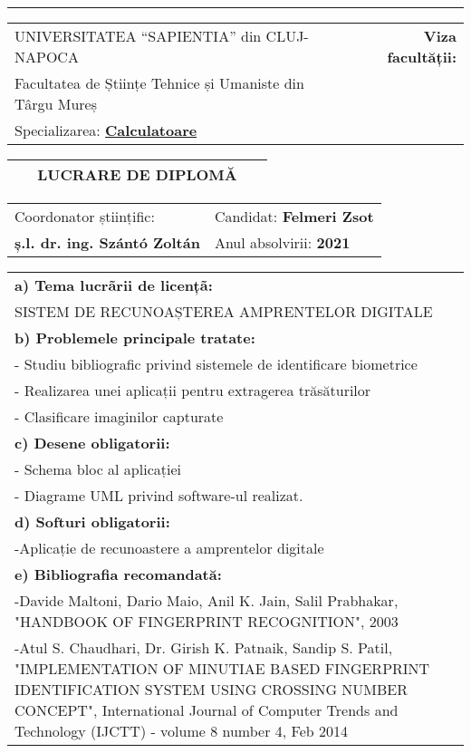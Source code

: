 \documentclass[a4paper, 11pt]{article}
\begin{document}
\begin{titlepage}
\noindent \rule{\textwidth}{1pt}
\vspace{1em}

\noindent \begin{tabular}{|l c r|}
\hline
UNIVERSITATEA “SAPIENTIA” din CLUJ-NAPOCA & & \textbf{Viza facultății:}\\
Facultatea de Științe Tehnice și Umaniste din Târgu Mureș & & \\
Specializarea: \textbf{\underline{Calculatoare}} & & \\
\hline
\end{tabular}
\begin{tabular}{|p{} c p{}|}
\ & \textbf{LUCRARE DE DIPLOMĂ} &\ \\[3pt]
\hline
\end{tabular}
\begin{tabular}{|p{} | p{}|}
Coordonator științific: & Candidat: \textbf{Felmeri Zsot}\\
\textbf{ș.l. dr. ing. Szántó Zoltán} & Anul absolvirii: \textbf{2021}\\
\hline
\end{tabular}
\begin{tabular}{|p{}|}
\textbf{a) Tema lucrãrii de licențã:}\\[3pt]
SISTEM DE RECUNOAȘTEREA AMPRENTELOR DIGITALE\\[4ex]
\textbf{b) Problemele principale tratate:}\\[3pt]
- Studiu bibliografic privind sistemele de identificare biometrice\\
- Realizarea unei aplicații pentru extragerea trăsăturilor\\
- Clasificare imaginilor capturate\\[4ex]
\textbf{c) Desene obligatorii:}\\[3pt]
- Schema bloc al aplicației\\
- Diagrame UML privind software-ul realizat.\\[4ex]
\textbf{d) Softuri obligatorii:}\\[3pt]
-Aplicație de recunoastere a amprentelor digitale\\[4ex]
\textbf{e) Bibliografia recomandată:}\\[3pt]
[1] -Davide Maltoni, Dario Maio, Anil K. Jain, Salil Prabhakar, "HANDBOOK OF FINGERPRINT RECOGNITION", 2003\\[2pt]
[2] -Atul S. Chaudhari, Dr. Girish K. Patnaik, Sandip S. Patil, "IMPLEMENTATION OF MINUTIAE BASED FINGERPRINT IDENTIFICATION SYSTEM USING CROSSING NUMBER CONCEPT", International Journal of Computer Trends and Technology (IJCTT) - volume 8 number 4,  Feb 2014\\[4ex]

\end{tabular}
\end{titlepage}
\end{document}
